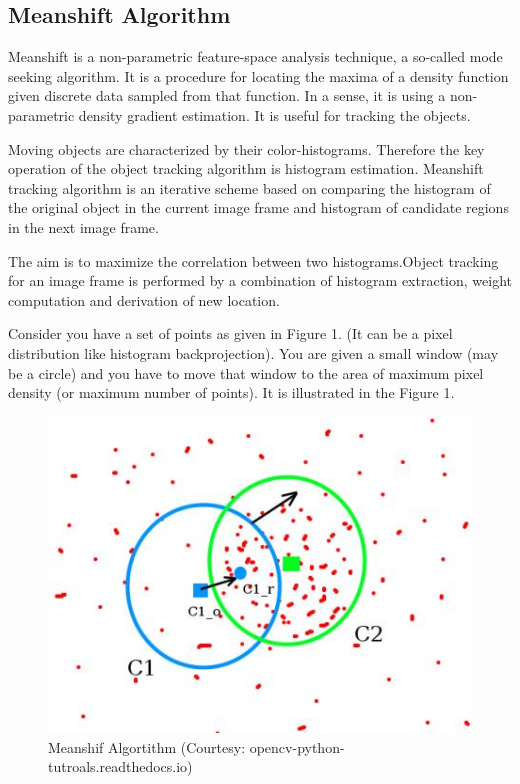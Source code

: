 \documentclass[11pt,a4paper]{article}
\begin{document}
		\subsection{Meanshift Algorithm}
			Meanshift is a non-parametric feature-space analysis technique, a so-called mode seeking algorithm. It is a procedure for locating the maxima of a density function given discrete data sampled from that function. In a sense, it is using a non-parametric density gradient estimation. It is useful for tracking the objects.
			
			Moving objects are characterized by their color-histograms. Therefore the key operation of the object tracking algorithm is histogram estimation. Meanshift tracking algorithm is an iterative scheme based on comparing the histogram of the original object in the current image frame and histogram of candidate regions in the next image frame. 
			 
			The aim is to maximize the correlation between two histograms.Object tracking for an image frame is performed by a combination of histogram extraction, weight computation and derivation of new location. 
			
			Consider you have a set of points as given in Figure 1. (It can be a pixel distribution like histogram backprojection). You are given a small window (may be a circle) and you have to move that window to the area of maximum pixel density (or maximum number of points). It is illustrated in the Figure 1.
			\begin{figure}[h!]
				\includegraphics[scale=0.5 ]{../Images/meanshift.jpg}
				\centering
				\caption{Meanshif Algortithm (Courtesy: opencv-python-tutroals.readthedocs.io)}
			\end{figure}
			
\end{document}
